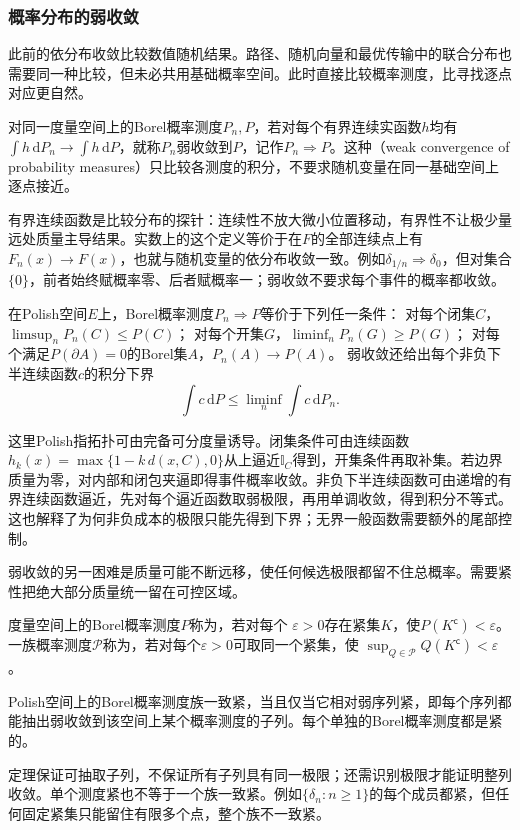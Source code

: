\subsubsection{概率分布的弱收敛}
\label{sec:rv-weak-convergence}
此前的依分布收敛比较数值随机结果。路径、随机向量和最优传输中的联合分布也需要同一种比较，但未必共用基础概率空间。此时直接比较概率测度，比寻找逐点对应更自然。

\begin{definition}[概率测度的弱收敛]
\label{def:information-weak-measure-convergence}
对同一度量空间上的Borel概率测度\(P_n,P\)，若对每个有界连续实函数\(h\)均有
\(\int h\,\mathrm dP_n\to\int h\,\mathrm dP\)，就称\(P_n\)弱收敛到\(P\)，记作\(P_n\Rightarrow P\)。这种（weak convergence of probability measures）只比较各测度的积分，不要求随机变量在同一基础空间上逐点接近。
\end{definition}
有界连续函数是比较分布的探针：连续性不放大微小位置移动，有界性不让极少量远处质量主导结果。实数上的这个定义等价于在\(F\)的全部连续点上有\(F_n(x)\to F(x)\)，也就与随机变量的依分布收敛一致。例如\(\delta_{1/n}\Rightarrow\delta_0\)，但对集合\(\{0\}\)，前者始终赋概率零、后者赋概率一；弱收敛不要求每个事件的概率都收敛。

\begin{theorem}[Portmanteau的常用形式]
\label{thm:rv-portmanteau}
在Polish空间\(E\)上，Borel概率测度\(P_n\Rightarrow P\)等价于下列任一条件：
对每个闭集\(C\)，\(\limsup_nP_n(C)\leq P(C)\)；
对每个开集\(G\)，\(\liminf_nP_n(G)\geq P(G)\)；
对每个满足\(P(\partial A)=0\)的Borel集\(A\)，\(P_n(A)\to P(A)\)。
弱收敛还给出每个非负下半连续函数\(c\)的积分下界
\[
\int c\,\mathrm dP\leq\liminf_n\int c\,\mathrm dP_n.
\]
\end{theorem}
这里Polish指拓扑可由完备可分度量诱导。闭集条件可由连续函数
\(h_k(x)=\max\{1-k\,d(x,C),0\}\)从上逼近\(\mathbb I_C\)得到，开集条件再取补集。若边界质量为零，对内部和闭包夹逼即得事件概率收敛。非负下半连续函数可由递增的有界连续函数逼近，先对每个逼近函数取弱极限，再用单调收敛，得到积分不等式。这也解释了为何非负成本的极限只能先得到下界；无界一般函数需要额外的尾部控制。

弱收敛的另一困难是质量可能不断远移，使任何候选极限都留不住总概率。需要紧性把绝大部分质量统一留在可控区域。
\begin{definition}[紧概率测度与一致紧族]
\label{def:information-tightness}
度量空间上的Borel概率测度\(P\)称为，若对每个
\(\varepsilon>0\)存在紧集\(K\)，使\(P(K^{\mathsf c})<\varepsilon\)。
一族概率测度\(\mathcal P\)称为，若对每个\(\varepsilon>0\)可取同一个紧集，使
\(\sup_{Q\in\mathcal P}Q(K^{\mathsf c})<\varepsilon\)。
\end{definition}
\begin{theorem}[Prokhorov定理]
\label{thm:rv-prokhorov}
Polish空间上的Borel概率测度族一致紧，当且仅当它相对弱序列紧，即每个序列都能抽出弱收敛到该空间上某个概率测度的子列。每个单独的Borel概率测度都是紧的。
\end{theorem}
定理保证可抽取子列，不保证所有子列具有同一极限；还需识别极限才能证明整列收敛。单个测度紧也不等于一个族一致紧。例如\(\{\delta_n:n\geq1\}\)的每个成员都紧，但任何固定紧集只能留住有限多个点，整个族不一致紧。


